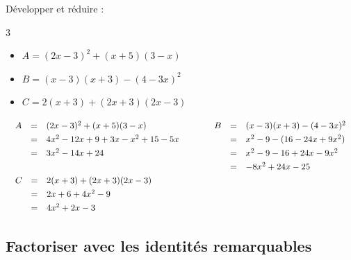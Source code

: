 \begin{methode}
	Développer et réduire :
	\begin{multicols}{3}
		\begin{itemize}
			\item $A = (2x - 3)^2 + (x + 5)(3 - x)$
			\item $B = (x - 3)(x + 3) - (4 - 3x)^2$
			\item $C = 2(x + 3) + (2x + 3)(2x - 3)$
		\end{itemize}
	\end{multicols}

	\begin{correction}
		\[
			\begin{array}{ll}%
				\def\arraystretch{1.3}%
				\begin{array}{rcl}%
					A & = & (2x - 3)^2 + (x + 5)(3 - x)         \\
					  & = & 4x^2 - 12x + 9 + 3x - x^2 + 15 - 5x \\
					  & = & 3x^2 - 14x + 24                     \\
					  &   &                                     \\
				\end{array} \quad & \quad %
				\def\arraystretch{1.3}%
				\begin{array}{rcl}%
					B & = & (x - 3)(x + 3) - (4 - 3x)^2 \\
					  & = & x^2 - 9 - (16 - 24x + 9x^2) \\
					  & = & x^2 - 9 - 16 + 24x - 9x^2   \\
					  & = & -8x^2 + 24x - 25            \\
				\end{array} \\%
				\def\arraystretch{1.3}%
				\begin{array}{rcl}%
					C & = & 2(x + 3) + (2x + 3)(2x - 3) \\
					  & = & 2x + 6 + 4x^2 - 9           \\
					  & = & 4x^2 + 2x - 3               \\
				\end{array}        \quad & \quad ~ %
			\end{array}%
		\]
	\end{correction}
\end{methode}

\newpage

\subsection{Factoriser avec les identités remarquables}

